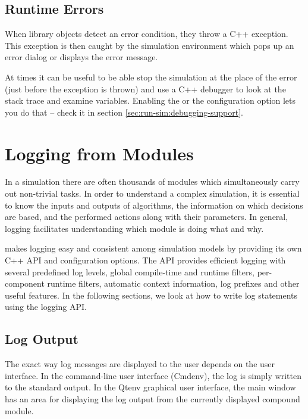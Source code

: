 \subsection{Runtime Errors}
\label{sec:sim-lib:runtime-errors}

When library objects detect an error condition, they throw a C++ exception.
This exception is then caught by the simulation environment which pops up
an error dialog or displays the error message.

At times it can be useful to be able stop the simulation at the place of
the error (just before the exception is thrown) and use a C++ debugger to
look at the stack trace and examine variables. Enabling the
 or the 
configuration option lets you do that -- check it in section
\ref{sec:run-sim:debugging-support}.


\section{Logging from Modules}
\label{sec:sim-lib:logging-from-modules}

In a simulation there are often thousands of modules which simultaneously carry
out non-trivial tasks. In order to understand a complex simulation, it is
essential to know the inputs and outputs of algorithms, the information on
which decisions are based, and the performed actions along with their parameters.
In general, logging facilitates understanding which module is doing what and why.

{\opp} makes logging easy and consistent among simulation models by providing
its own C++ API and configuration options. The API provides efficient logging
with several predefined log levels, global compile-time and runtime filters,
per-component runtime filters, automatic context information, log prefixes and
other useful features. In the following sections, we look at how to write log
statements using the {\opp} logging API.

\subsection{Log Output}
\label{sec:sim-lib:log-output}

The exact way log messages are displayed to the user depends on the user interface.
In the command-line user interface (Cmdenv), the log is simply
written to the standard output. In the Qtenv graphical user interface,
the main window has an area for displaying the log output from the currently
displayed compound module.

